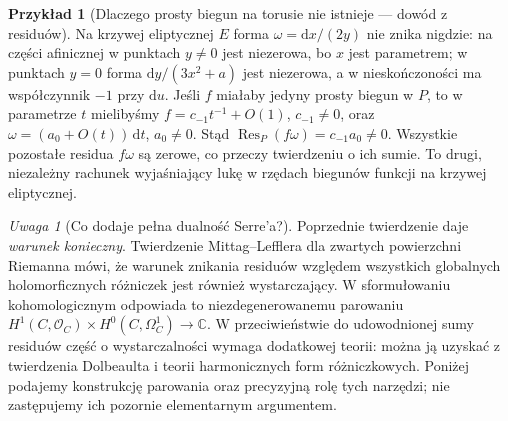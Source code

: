 \documentclass[11pt,a4paper,openany]{report}
\numberwithin{equation}{section}
\theoremstyle{plain}
\theoremstyle{definition}
\newtheorem{przyklad}[twierdzenie]{Przykład}
\theoremstyle{remark}
\newtheorem{uwaga}[twierdzenie]{Uwaga}
\newcommand{\C}{\mathbb C}
\begin{document}
\begin{przyklad}[Dlaczego prosty biegun na torusie nie istnieje — dowód z residuów]
Na krzywej eliptycznej $E$ forma $\omega=\mathrm dx/(2y)$
nie znika nigdzie: na części afinicznej w punktach
$y\ne0$ jest niezerowa, bo $x$ jest parametrem;
w punktach $y=0$ forma $\mathrm dy/(3x^2+a)$ jest
niezerowa, a w nieskończoności ma współczynnik $-1$
przy $\mathrm du$. Jeśli $f$ miałaby jedyny prosty
biegun w $P$, to w parametrze $t$ mielibyśmy
$f=c_{-1}t^{-1}+O(1)$, $c_{-1}\ne0$, oraz
$\omega=(a_0+O(t))\,\mathrm dt$, $a_0\ne0$.
Stąd $\operatorname{Res}_P(f\omega)=c_{-1}a_0\ne0$.
Wszystkie pozostałe residua $f\omega$ są zerowe,
co przeczy twierdzeniu o ich sumie.
To drugi, niezależny rachunek wyjaśniający lukę
w rzędach biegunów funkcji na krzywej eliptycznej.
\end{przyklad}

\begin{uwaga}[Co dodaje pełna dualność Serre'a?]
Poprzednie twierdzenie daje \emph{warunek konieczny}.
Twierdzenie Mittag--Lefflera dla zwartych powierzchni
Riemanna mówi, że warunek znikania residuów względem
wszystkich globalnych holomorficznych różniczek
jest również wystarczający. W sformułowaniu
kohomologicznym odpowiada to niezdegenerowanemu
parowaniu
$H^1(C,\mathcal O_C)\times H^0(C,\Omega^1_C)\to\C$.
W przeciwieństwie do udowodnionej sumy residuów
część o wystarczalności wymaga dodatkowej teorii:
można ją uzyskać z twierdzenia Dolbeaulta i teorii
harmonicznych form różniczkowych. Poniżej podajemy
konstrukcję parowania oraz precyzyjną rolę tych
narzędzi; nie zastępujemy ich pozornie elementarnym
argumentem.
\end{uwaga}
\end{document}
